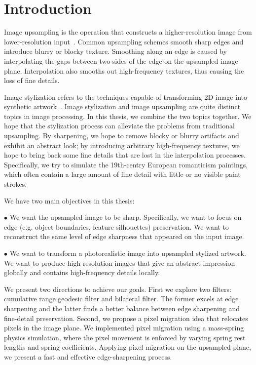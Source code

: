 \pagestyle{headings}
\chapter{Introduction} \label{chapter:ch1}

Image upsampling is the operation that constructs a higher-resolution image from lower-resolution input~\cite{Shan:fiu}. Common upsampling schemes smooth sharp edges and introduce blurry or blocky texture. Smoothing along an edge is caused by interpolating the gaps between two sides of the edge on the upsampled image plane. Interpolation also smooths out high-frequency textures, thus causing the loss of fine details. 

Image stylization refers to the techniques capable of transforming 2D image into synthetic artwork~\cite{NPRbook}. Image stylization and image upsampling are quite distinct topics in image processing. In this thesis, we combine the two topics together. We hope that the stylization process can alleviate the problems from traditional upsampling. By sharpening, we hope to remove blocky or blurry artifacts and exhibit an abstract look; by introducing arbitrary high-frequency textures, we hope to bring back some fine details that are lost in the interpolation processes. Specifically, we try to simulate the 19th-centry European romanticism paintings, which often contain a large amount of fine detail with little or no visible paint strokes.

We have two main objectives in this thesis:

$\bullet$ We want the upsampled image to be sharp. Specifically, we want to focus on edge (e.g. object boundaries, feature silhouettes) preservation. We want to reconstruct the same level of edge sharpness that appeared on the input image.

$\bullet$ We want to transform a photorealistic image into upsampled stylized artwork. We want to produce high resolution images that give an abstract impression globally and contains high-frequency details locally. 

We present two directions to achieve our goals. First we explore two filters: cumulative range geodesic filter and bilateral filter. The former excels at edge sharpening and the latter finds a better balance between edge sharpening and fine-detail preservation. Second, we propose a pixel migration idea that relocates pixels in the image plane. We implemented pixel migration using a mass-spring physics simulation, where the pixel movement is enforced by varying spring rest lengths and spring coefficients. Applying pixel migration on the upsampled plane, we present a fast and effective edge-sharpening process. 


